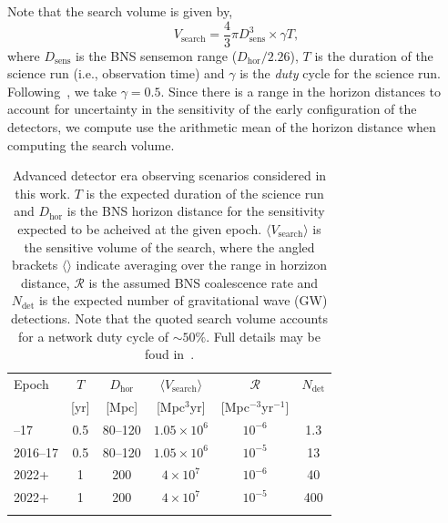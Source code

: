 \documentclass[twocolumn,nofootinbib]{revtex4-1}
\newcommand{\cbcrate}{{{\mathcal R}}}
\def\gw#1{gravitational wave#1 (GW#1)\gdef\gw{GW}}
\begin{document}
Note that the search volume is given by,
\begin{equation}\label{eq:search_volume}
V_{\mathrm{search}} = \frac{4}{3}\pi D_{\mathrm{sens}}^3 \times \gamma T,
\end{equation}
%
where $D_{\mathrm{sens}}$ is the BNS sensemon range ($D_{\mathrm{hor}}/2.26$),
$T$ is the duration of the science run (i.e., observation time) and $\gamma$ is
the \emph{duty} cycle for the science run.  Following~\cite{ade_prospects}, we
take $\gamma=0.5$.  Since there is a range in the horizon distances to account
for uncertainty in the sensitivity of the early configuration of the detectors,
we compute use the arithmetic mean of the horizon distance when computing the
search volume.

\begin{table}
\centering
\begin{tabular}{l c c c c c }
\toprule
Epoch & $T$ & $D_{\mathrm{hor}}$ &
$\langle V_{\mathrm{search}}\rangle$ & $\cbcrate$ & $N_{\mathrm{det}}$ \\
 & [yr] & [Mpc] & [Mpc$^3$yr] &  [Mpc$^{-3}$yr$^{-1}$] \\
\colrule
2016--17 & 0.5 & 80--120 & $1.05\times10^6$ & $10^{-6}$ & 1.3 \\
2016--17 & 0.5 & 80--120 & $1.05\times10^6$ & $10^{-5}$ & 13 \\
2022+ & 1 & 200 & $4\times10^7$ & $10^{-6}$ & 40 \\
2022+ & 1 & 200 & $4\times10^7$ & $10^{-5}$ & 400 \\
\botrule
\end{tabular}
\caption{Advanced detector era observing scenarios considered in this work.  $T$
is the expected duration of the science run and $D_{\mathrm{hor}}$ is the BNS
horizon distance for the sensitivity expected to be acheived at the given epoch.
$\langle V_{\mathrm{search}}\rangle $ is the sensitive volume of the search,
where the angled brackets $\langle \rangle$ indicate averaging over the range
in horzizon distance, $\cbcrate$ is the assumed BNS coalescence rate and
$N_{\mathrm{det}}$ is the expected number of \gw{} detections.  Note that the
quoted search volume accounts for a network duty cycle of $\sim 50\%$.
Full details may be foud in~\cite{ade_prospects}.\label{table:scenarios}}
\end{table}
\end{document}
